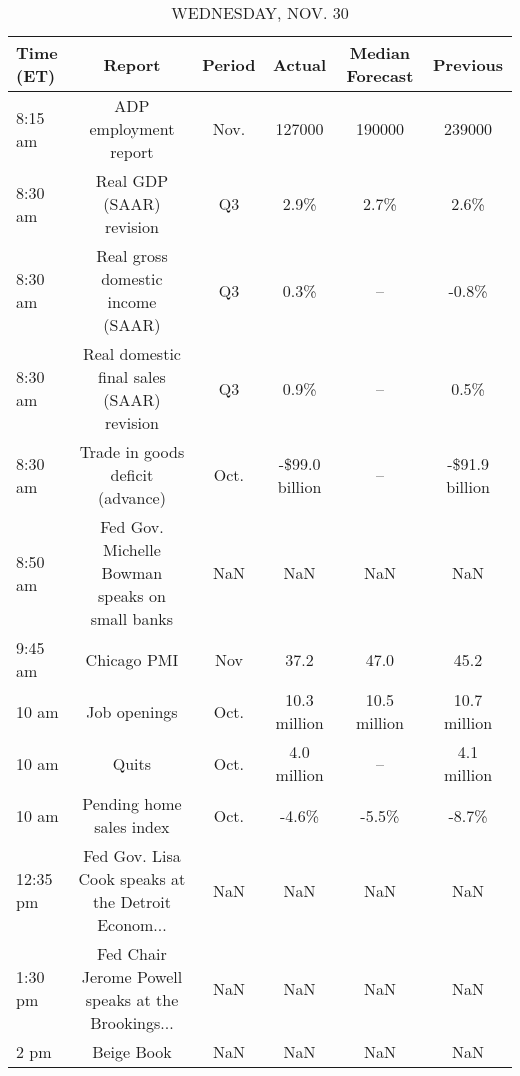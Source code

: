 \documentclass{article}%
\begin{document}
\begin{table}[htbp]%
\caption{WEDNESDAY, NOV. 30}%
\centering%
\begin{adjustbox}{width=1\textwidth}%
\begin{tabular}{lccccc}
\toprule
Time (ET) &                                             Report & Period &         Actual & Median Forecast &       Previous \\
\midrule
  8:15 am &                              ADP employment report &   Nov. &         127000 &          190000 &         239000 \\
  8:30 am &                           Real GDP (SAAR) revision &     Q3 &           2.9\% &            2.7\% &           2.6\% \\
  8:30 am &                  Real gross domestic income (SAAR) &     Q3 &           0.3\% &              -- &          -0.8\% \\
  8:30 am &          Real domestic final sales (SAAR) revision &     Q3 &           0.9\% &              -- &           0.5\% \\
  8:30 am &                   Trade in goods deficit (advance) &   Oct. & -\$99.0 billion &              -- & -\$91.9 billion \\
  8:50 am &     Fed Gov. Michelle Bowman speaks on small banks &    NaN &            NaN &             NaN &            NaN \\
  9:45 am &                                        Chicago PMI &    Nov &           37.2 &            47.0 &           45.2 \\
    10 am &                                       Job openings &   Oct. &   10.3 million &    10.5 million &   10.7 million \\
    10 am &                                              Quits &   Oct. &    4.0 million &              -- &    4.1 million \\
    10 am &                           Pending home sales index &   Oct. &          -4.6\% &           -5.5\% &          -8.7\% \\
 12:35 pm & Fed Gov. Lisa Cook speaks at the Detroit Econom... &    NaN &            NaN &             NaN &            NaN \\
  1:30 pm & Fed Chair Jerome Powell speaks at the Brookings... &    NaN &            NaN &             NaN &            NaN \\
     2 pm &                                         Beige Book &    NaN &            NaN &             NaN &            NaN \\
\bottomrule
\end{tabular}
%
\end{adjustbox}%
\end{table}
\end{document}
